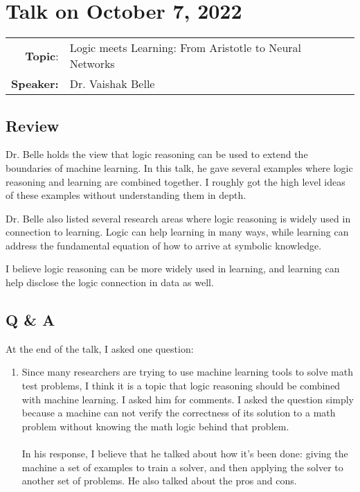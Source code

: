 \documentclass[11pt, oneside]{article}   	%
\begin{document}
\newpage
\section{Talk on October 7, 2022}

\begin{tabularx} {\textwidth}{r X}
\textbf{Topic}: & Logic meets Learning: From Aristotle to Neural Networks\\
\textbf{Speaker:} & Dr. Vaishak Belle\\
\end{tabularx}

\subsection{Review}
Dr. Belle holds the view that logic reasoning can be used to extend the boundaries of machine learning. In this talk, he gave several examples where logic reasoning and learning are combined together. I roughly got the high level ideas of these examples without understanding them in depth. 

Dr. Belle also listed several research areas where logic reasoning is widely used in connection to learning. Logic can help learning in many ways, while learning can address the fundamental equation of how to arrive at symbolic knowledge. 

I believe logic reasoning can be more widely used in learning, and learning can help disclose the logic connection in data as well.


\subsection{Q \& A}
At the end of the talk, I asked one question:
\begin{enumerate}
\item Since many researchers are trying to use machine learning tools to solve math test problems, I think it is a topic that logic reasoning should be combined with machine learning. I asked him for comments. I asked the question simply because a machine can not verify the correctness of its solution to a math problem without knowing the math logic behind that problem.\\ \\
In his response, I believe that he talked about how it's been done: giving the machine a set of examples to train a solver, and then applying the solver to another set of problems. He also talked about the pros and cons.\\


\end{enumerate}
\end{document}
